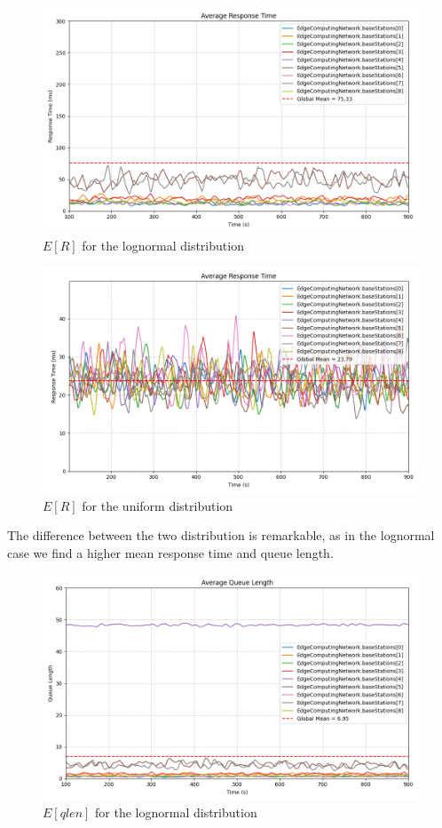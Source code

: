 \documentclass{report}
\begin{document}
\begin{figure}[H]
    \centering
    \includegraphics[width=\textwidth]{img/plots/log_1e3_A/resptime.png}
    \caption{$E[R]$ for the lognormal distribution}
\end{figure}

\begin{figure}[H]
    \centering
    \includegraphics[width=\textwidth]{img/plots/uni_1e3_A/resptime.png}
    \caption{$E[R]$ for the uniform distribution}
\end{figure}

The difference between the two distribution is remarkable, as in the lognormal case we find a higher mean response time and queue length.

\begin{figure}[H]
    \centering
    \includegraphics[width=\textwidth]{img/plots/log_1e3_A/qlen.png}
    \caption{$E[qlen]$ for the lognormal distribution}
\end{figure}
\end{document}
